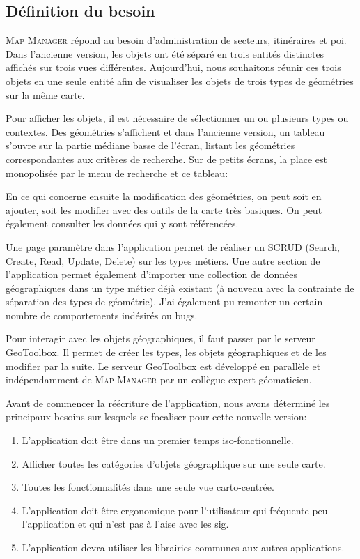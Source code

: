 \documentclass{rapportUHA40}
\begin{document}

\subsection{Définition du besoin}
\textsc{Map Manager} répond au besoin d'administration de secteurs,
itinéraires et poi. Dans l'ancienne version, les objets ont été séparé en trois
entités distinctes affichés sur trois vues différentes. Aujourd'hui, nous
souhaitons réunir ces trois objets en une seule entité afin de visualiser les
objets de trois types de géométries sur la même carte.

Pour afficher les objets, il est nécessaire de sélectionner un ou plusieurs
types ou contextes. Des géométries s'affichent et dans l'ancienne version, un
tableau s'ouvre sur la partie médiane basse de l'écran, listant les géométries
correspondantes aux critères de recherche. Sur de petits écrans, la place est
monopolisée par le menu de recherche et ce tableau:

En ce qui concerne ensuite la modification des géométries, on peut soit en
ajouter, soit les modifier avec des outils de la carte très basiques. On peut
également consulter les données qui y sont référencées.

Une page paramètre dans l'application permet de réaliser un SCRUD (Search,
Create, Read, Update, Delete) sur les types métiers. Une autre section de
l'application permet également d'importer une collection de données
géographiques dans un type métier déjà existant (à nouveau avec la contrainte
de séparation des types de géométrie). J'ai également pu remonter un certain
nombre de comportements indésirés ou bugs.

Pour interagir avec les objets géographiques, il faut passer par le serveur
GeoToolbox. Il permet de créer les types, les objets géographiques et de les
modifier par la suite. Le serveur GeoToolbox est développé en parallèle et
indépendamment de \textsc{Map Manager} par un collègue expert géomaticien.

Avant de commencer la réécriture de l'application, nous avons déterminé les
principaux besoins sur lesquels se focaliser pour cette nouvelle version:
\begin{enumerate}
  \item L'application doit être dans un premier temps iso-fonctionnelle.
  \item Afficher toutes les catégories d'objets géographique sur une seule carte.
  \item Toutes les fonctionnalités dans une seule vue carto-centrée.
  \item L'application doit être ergonomique pour l'utilisateur qui fréquente peu
        l'application et qui n'est pas à l'aise avec les \gls{sig}.
  \item L'application devra utiliser les librairies communes aux autres applications.
\end{enumerate}
\end{document}
